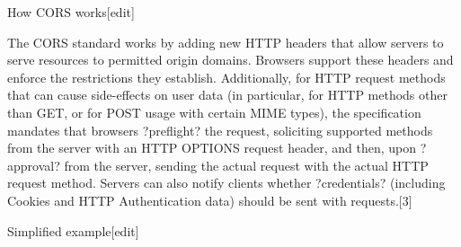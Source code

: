 



How CORS works[edit]

The CORS standard works by adding new HTTP headers that allow servers to serve resources to permitted origin domains. Browsers support these headers and enforce the restrictions they establish. Additionally, for HTTP request methods that can cause side-effects on user data (in particular, for HTTP methods other than GET, or for POST usage with certain MIME types), the specification mandates that browsers ?preflight? the request, soliciting supported methods from the server with an HTTP OPTIONS request header, and then, upon ?approval? from the server, sending the actual request with the actual HTTP request method. Servers can also notify clients whether ?credentials? (including Cookies and HTTP Authentication data) should be sent with requests.[3]

Simplified example[edit]


